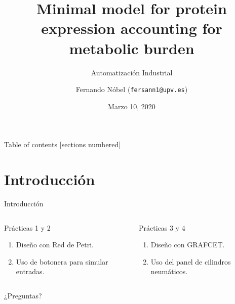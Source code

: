 \documentclass[10pt,table]{beamer}
\title{Minimal model for protein expression accounting for metabolic burden}
\subtitle{Automatización Industrial}
\author{Fernando Nóbel (\texttt{fersann1@upv.es})}
\date{Marzo 10, 2020}
\institute{Universitat Polit\`ecnica de Val\`encia}
\begin{document}
\maketitle

\begin{frame}{Table of contents}
  [sections numbered]
  \tableofcontents[hideallsubsections]
\end{frame}

\section{Introducción}

\begin{frame}{Introducción}

  \begin{columns}[T,onlytextwidth]
    \begin{exampleblock}{Prácticas 1 y 2}
      \begin{enumerate}
        \item Diseño con Red de Petri.
        \item Uso de botonera para simular entradas.
      \end{enumerate}
    \end{exampleblock}

    \begin{alertblock}{Prácticas 3 y 4}
      \begin{enumerate}
        \item Diseño con GRAFCET.
        \item Uso del panel de cilindros neumáticos.
      \end{enumerate}
    \end{alertblock}

  \end{columns}
\end{frame}

\begin{frame}[standout]
  ¿Preguntas?
\end{frame}
\end{document}

